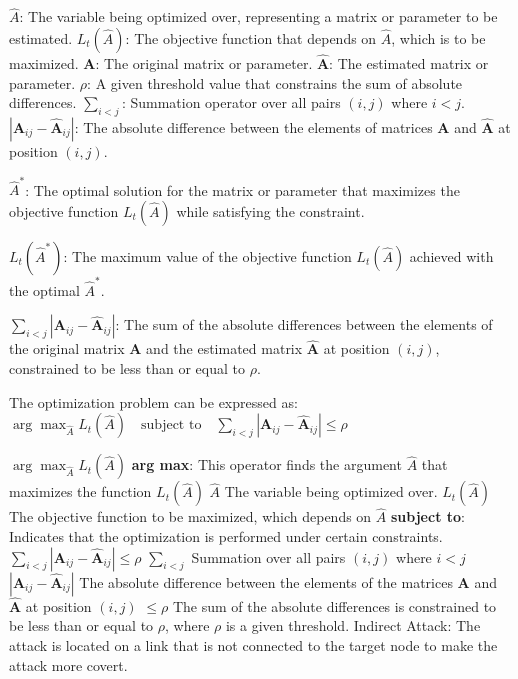$\hat{A}$: The variable being optimized over, representing a matrix or parameter to be estimated.
$L_t(\hat{A})$: The objective function that depends on $\hat{A}$, which is to be maximized.
$\mathbf{A}$: The original matrix or parameter.
$\hat{\mathbf{A}}$: The estimated matrix or parameter.
$\rho$: A given threshold value that constrains the sum of absolute differences.
$\sum_{i<j}$: Summation operator over all pairs $(i, j)$ where $i < j$.
$|\mathbf{A}_{ij} - \hat{\mathbf{A}}_{ij}|$: The absolute difference between the elements of matrices $\mathbf{A}$ and $\hat{\mathbf{A}}$ at position $(i, j)$.

$\hat{A}^*$: The optimal solution for the matrix or parameter that maximizes the objective function $L_t(\hat{A})$ while satisfying the constraint.

$L_t(\hat{A}^*)$: The maximum value of the objective function $L_t(\hat{A})$ achieved with the optimal $\hat{A}^*$.

$\sum_{i<j} |\mathbf{A}_{ij} - \hat{\mathbf{A}}_{ij}|$: The sum of the absolute differences between the elements of the original matrix $\mathbf{A}$ and the estimated matrix $\hat{\mathbf{A}}$ at position $(i, j)$, constrained to be less than or equal to $\rho$.

The optimization problem can be expressed as:
$\arg \max_{\hat{A}} L_t(\hat{A}) \quad \text{subject to} \quad \sum_{i<j} |\mathbf{A}_{ij} - \hat{\mathbf{A}}_{ij}| \leq \rho$

$ \arg \max_{\hat{A}} L_t(\hat{A})$
\textbf{arg max}: This operator finds the argument \( \hat{A} \) that maximizes the function $ L_t(\hat{A})$
$\hat{A}$ The variable being optimized over.
$L_t(\hat{A})$ The objective function to be maximized, which depends on $\hat{A}$
\textbf{subject to}:
Indicates that the optimization is performed under certain constraints.
$ \sum_{i<j} |\mathbf{A}_{ij} - \hat{\mathbf{A}}_{ij}| \leq \rho $
$ \sum_{i<j}$ Summation over all pairs $ (i, j) $ where $ i < j $
$ |\mathbf{A}_{ij} - \hat{\mathbf{A}}_{ij}| $ 
The absolute difference between the elements of the matrices $ \mathbf{A} $ 
and $ \hat{\mathbf{A}} $ at position $ (i, j)$
$ \leq \rho $ 
The sum of the absolute differences is constrained to be less than or equal to $ \rho$, where $\rho $ is a given threshold.
Indirect Attack: The attack is located on a link that is not connected to the target node to make the attack more covert.